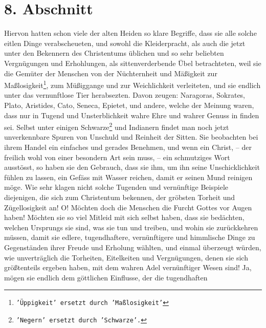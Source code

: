 \section{8. Abschnitt} \label{kap14_ab8}

Hiervon hatten schon viele der alten Heiden so klare
Begriffe, dass sie alle
solche eitlen Dinge verabscheueten, und sowohl die Kleiderpracht, als auch die
jetzt unter den Bekennern des Christentums üblichen und so sehr beliebten
Vergnügungen und Erhohlungen, als sittenverderbende Übel betrachteten, weil sie
die Gemüter der Menschen von der Nüchternheit und Mäßigkeit zur
Maßlosigkeit\footnote{\texttt{'Üppigkeit'
ersetzt durch 'Maßlosigkeit'}}, zum
Müßiggange und zur Weichlichkeit verleiteten, und sie
endlich
unter das
vernunftlose Tier herabsezten. Davon zeugen:
Naragoras, Sokrates,
Plato,
Aristides, Cato,
Seneca,
Epietet, und andere, welche der Meinung waren, dass nur
in
Tugend und Unsterblichkeit wahre Ehre und wahrer
Genuss in
finden sei. Selbst
unter einigen Schwarze\footnote{\texttt{'Negern' ersetzt durch 'Schwarze'.}}
 und Indianern findet man noch
jetzt unverkennbare
Spuren
von Unschuld und Reinheit der Sitten. Sie beobachten bei ihrem Handel ein
einfaches und gerades Benehmen, und wenn ein Christ, --
der freilich wohl von
einer besondern Art sein muss, -- ein schmutziges Wort ausstösst, so haben sie
den
Gebrauch, dass sie ihm, um ihn seine Unschicklichkeit fühlen zu lassen, ein
Gefäss mit Wasser reichen, damit er seinen Mund reinigen möge. Wie sehr klagen
nicht solche Tugenden und vernünftige Beispiele diejenigen, die sich zum
Christentum bekennen, der gröbsten Torheit und Zügellosigkeit an! O! Möchten
doch die Menschen die Furcht Gottes vor Augen haben! Möchten sie so viel Mitleid
mit sich selbst haben, dass sie bedächten, welchen Ursprungs sie sind, was sie
tun und treiben, und wohin sie zurückkehren müssen, damit sie edlere,
tugendhaftere, vernünftigere und himmlische Dinge zu Gegenständen ihrer Freude
und Erholung wählten, und einmal überzeugt würden, wie unverträglich die
Torheiten, Eitelkeiten und Vergnügungen, denen sie sich größtenteils ergeben
haben, mit dem wahren Adel vernünftiger Wesen sind! Ja, mögen sie endlich dem
göttlichen Einflusse, der die tugendhaften
